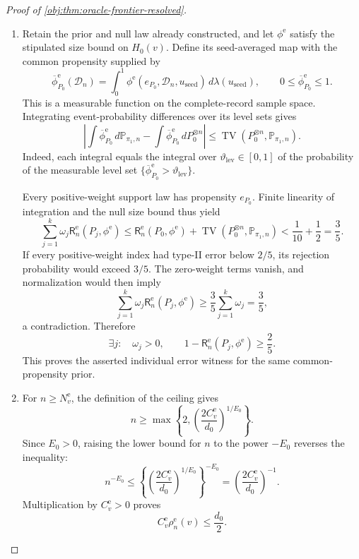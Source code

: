 \begin{proof}[Proof of \cref{obj:thm:oracle-frontier-resolved}]
\begin{enumerate}
\item Retain the prior and null law already constructed, and let \(\phi^{\mathrm e}\) satisfy the stipulated size bound on \(H_0(v)\). Define its seed-averaged map with the common propensity supplied by
\[
\overline\phi^{\mathrm e}_{P_0}(\mathcal D_n)
=\int_0^1\phi^{\mathrm e}(e_{P_0},\mathcal D_n,u_{\mathrm{seed}})\,d\lambda(u_{\mathrm{seed}}),
\qquad
0\le\overline\phi^{\mathrm e}_{P_0}\le1.
\]
This is a measurable function on the complete-record sample space. Integrating event-probability differences over its level sets gives
\[
\left|
\int\overline\phi^{\mathrm e}_{P_0}\,d\mathbb P_{\pi_1,n}
-\int\overline\phi^{\mathrm e}_{P_0}\,dP_0^{\otimes n}
\right|
\le\operatorname{TV}\!\left(P_0^{\otimes n},\mathbb P_{\pi_1,n}\right).
\]
Indeed, each integral equals the integral over \(\vartheta_{\mathrm{lev}}\in[0,1]\) of the probability of the measurable level set
\(\{\overline\phi^{\mathrm e}_{P_0}>\vartheta_{\mathrm{lev}}\}\).

Every positive-weight support law has propensity \(e_{P_0}\). Finite linearity of integration and the null size bound thus yield
\[
\sum_{j=1}^{k}\omega_j
\mathsf R_n^{\mathrm e}(P_j,\phi^{\mathrm e})
\le
\mathsf R_n^{\mathrm e}(P_0,\phi^{\mathrm e})
+\operatorname{TV}\!\left(P_0^{\otimes n},\mathbb P_{\pi_1,n}\right)
<\frac1{10}+\frac12=\frac35.
\]
If every positive-weight index had type-II error below \(2/5\), its rejection probability would exceed \(3/5\). The zero-weight terms vanish, and normalization would then imply
\[
\sum_{j=1}^{k}\omega_j
\mathsf R_n^{\mathrm e}(P_j,\phi^{\mathrm e})
\ge\frac35\sum_{j=1}^{k}\omega_j=\frac35,
\]
a contradiction. Therefore
\[
\exists j:\quad
\omega_j>0,\qquad
1-\mathsf R_n^{\mathrm e}(P_j,\phi^{\mathrm e})\ge\frac25.
\]
This proves the asserted individual error witness for the same common-propensity prior.

\item For \(n\ge N^{\mathrm e}_v\), the definition of the ceiling gives
\[
n\ge
\max\left\{2,\left(\frac{2C^{\mathrm e}_v}{d_0}\right)^{1/E_0}\right\}.
\]
Since \(E_0>0\), raising the lower bound for \(n\) to the power \(-E_0\) reverses the inequality:
\[
n^{-E_0}
\le
\left\{
\left(\frac{2C^{\mathrm e}_v}{d_0}\right)^{1/E_0}
\right\}^{-E_0}
=\left(\frac{2C^{\mathrm e}_v}{d_0}\right)^{-1}.
\]
Multiplication by \(C^{\mathrm e}_v>0\) proves
\[
C^{\mathrm e}_v\rho_n^{\mathrm e}(v)\le\frac{d_0}{2}.
\]


\end{enumerate}
\end{proof}
